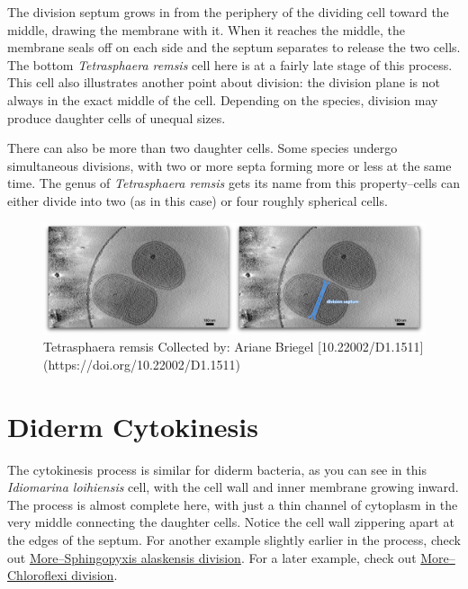 \documentclass[]{tufte-book}
\begin{document}
The division septum grows in from the periphery of the dividing cell
toward the middle, drawing the membrane with it. When it reaches the
middle, the membrane seals off on each side and the septum separates to
release the two cells. The bottom \emph{Tetrasphaera remsis} cell here
is at a fairly late stage of this process. This cell also illustrates
another point about division: the division plane is not always in the
exact middle of the cell. Depending on the species, division may produce
daughter cells of unequal sizes.

There can also be more than two daughter cells. Some species undergo
simultaneous divisions, with two or more septa forming more or less at
the same time. The genus of \emph{\emph{Tetrasphaera} remsis} gets its
name from this property--cells can either divide into two (as in this
case) or four roughly spherical cells.

\begin{figure}
\includegraphics{movie_stills/5_5} \caption[Tetrasphaera remsis Collected by]{Tetrasphaera remsis Collected by: Ariane Briegel [10.22002/D1.1511](https://doi.org/10.22002/D1.1511)}\label{fig:unnamed-chunk-86}
\end{figure}

\section{Diderm Cytokinesis}\label{diderm-cytokinesis}

The cytokinesis process is similar for diderm bacteria, as you can see
in this \emph{Idiomarina loihiensis} cell, with the cell wall and inner
membrane growing inward. The process is almost complete here, with just
a thin channel of cytoplasm in the very middle connecting the daughter
cells. Notice the cell wall zippering apart at the edges of the septum.
For another example slightly earlier in the process, check out
\protect\hyperlink{moresphingopyxis-alaskensis-division}{More--Sphingopyxis
alaskensis division}. For a later example, check out
\protect\hyperlink{morechloroflexi-division}{More--Chloroflexi
division}.
\end{document}
